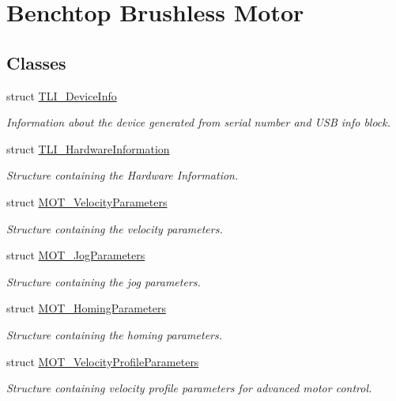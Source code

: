 \hypertarget{group___benchtop_brushless_motor}{}\section{Benchtop Brushless Motor}
\label{group___benchtop_brushless_motor}
\subsection*{Classes}
\begin{DoxyCompactItemize}
\item 
struct \hyperlink{struct_t_l_i___device_info}{T\+L\+I\+\_\+\+Device\+Info}
\begin{DoxyCompactList}\small\item\em Information about the device generated from serial number and U\+SB info block. \end{DoxyCompactList}\item 
struct \hyperlink{struct_t_l_i___hardware_information}{T\+L\+I\+\_\+\+Hardware\+Information}
\begin{DoxyCompactList}\small\item\em Structure containing the Hardware Information. \end{DoxyCompactList}\item 
struct \hyperlink{struct_m_o_t___velocity_parameters}{M\+O\+T\+\_\+\+Velocity\+Parameters}
\begin{DoxyCompactList}\small\item\em Structure containing the velocity parameters. \end{DoxyCompactList}\item 
struct \hyperlink{struct_m_o_t___jog_parameters}{M\+O\+T\+\_\+\+Jog\+Parameters}
\begin{DoxyCompactList}\small\item\em Structure containing the jog parameters. \end{DoxyCompactList}\item 
struct \hyperlink{struct_m_o_t___homing_parameters}{M\+O\+T\+\_\+\+Homing\+Parameters}
\begin{DoxyCompactList}\small\item\em Structure containing the homing parameters. \end{DoxyCompactList}\item 
struct \hyperlink{struct_m_o_t___velocity_profile_parameters}{M\+O\+T\+\_\+\+Velocity\+Profile\+Parameters}
\begin{DoxyCompactList}\small\item\em Structure containing velocity profile parameters for advanced motor control. \end{DoxyCompactList}\item 

\end{DoxyCompactItemize}
